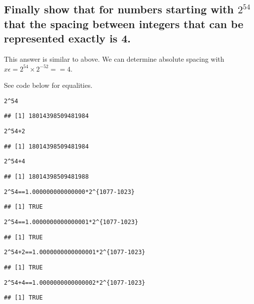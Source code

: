 \documentclass{article}\usepackage[]{graphicx}\usepackage[]{color}
\makeatletter
\newcommand{\hlnum}[1]{\textcolor[rgb]{0.686,0.059,0.569}{#1}}%
\newcommand{\hlopt}[1]{\textcolor[rgb]{0,0,0}{#1}}%
\newcommand{\hlstd}[1]{\textcolor[rgb]{0.345,0.345,0.345}{#1}}%
\newenvironment{kframe}{%
 \def\at@end@of@kframe{}%
 \ifinner\ifhmode%
  \def\at@end@of@kframe{\end{minipage}}%
  \begin{minipage}{\columnwidth}%
 \fi\fi%
 \def\FrameCommand##1{\hskip\@totalleftmargin \hskip-\fboxsep
 \colorbox{shadecolor}{##1}\hskip-\fboxsep
     \hskip-\linewidth \hskip-\@totalleftmargin \hskip\columnwidth}%
 \MakeFramed {\advance\hsize-\width
   \@totalleftmargin\z@ \linewidth\hsize
   \@setminipage}}%
 {\par\unskip\endMakeFramed%
 \at@end@of@kframe}
\newenvironment{knitrout}{}{} %
\makeatother
\begin{document}
\subsection{Finally show that for numbers starting with $2^{54}$ that the spacing between integers that can be represented exactly is 4.}

This answer is similar to above. We can determine absolute spacing with $x\epsilon = 2^{54} \times 2^{-52} == 4$. 

See code below for equalities.
\begin{knitrout}
\color{fgcolor}\begin{kframe}
\begin{alltt}
\hlnum{2}\hlopt{^}\hlnum{54}
\end{alltt}
\begin{verbatim}
## [1] 18014398509481984
\end{verbatim}
\begin{alltt}
\hlnum{2}\hlopt{^}\hlnum{54} \hlopt{+} \hlnum{2}
\end{alltt}
\begin{verbatim}
## [1] 18014398509481984
\end{verbatim}
\begin{alltt}
\hlnum{2}\hlopt{^}\hlnum{54} \hlopt{+} \hlnum{4}
\end{alltt}
\begin{verbatim}
## [1] 18014398509481988
\end{verbatim}
\begin{alltt}
\hlnum{2}\hlopt{^}\hlnum{54} \hlopt{==} \hlnum{1.000000000000000} \hlopt{*} \hlnum{2}\hlopt{^}\hlstd{\{}\hlnum{1077}\hlopt{-}\hlnum{1023}\hlstd{\}}
\end{alltt}
\begin{verbatim}
## [1] TRUE
\end{verbatim}
\begin{alltt}
\hlnum{2}\hlopt{^}\hlnum{54} \hlopt{==} \hlnum{1.0000000000000001} \hlopt{*} \hlnum{2}\hlopt{^}\hlstd{\{}\hlnum{1077}\hlopt{-}\hlnum{1023}\hlstd{\}}
\end{alltt}
\begin{verbatim}
## [1] TRUE
\end{verbatim}
\begin{alltt}
\hlnum{2}\hlopt{^}\hlnum{54} \hlopt{+} \hlnum{2} \hlopt{==} \hlnum{1.0000000000000001} \hlopt{*} \hlnum{2}\hlopt{^}\hlstd{\{}\hlnum{1077}\hlopt{-}\hlnum{1023}\hlstd{\}}
\end{alltt}
\begin{verbatim}
## [1] TRUE
\end{verbatim}
\begin{alltt}
\hlnum{2}\hlopt{^}\hlnum{54} \hlopt{+} \hlnum{4} \hlopt{==} \hlnum{1.0000000000000002} \hlopt{*} \hlnum{2}\hlopt{^}\hlstd{\{}\hlnum{1077}\hlopt{-}\hlnum{1023}\hlstd{\}}
\end{alltt}
\begin{verbatim}
## [1] TRUE
\end{verbatim}
\end{kframe}
\end{knitrout}
\end{document}
